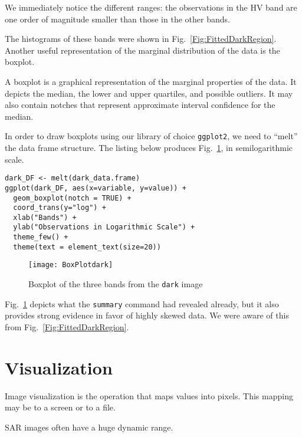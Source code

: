 We immediately notice the different ranges: the observations in the HV band are one order of magnitude smaller than those in the other bands.

The histograms of these bands were shown in Fig.~\ref{Fig:FittedDarkRegion}.
Another useful representation of the marginal distribution of the data is the boxplot.

A boxplot is a graphical representation of the marginal properties of the data.
It depicts the median, the lower and upper quartiles, and possible outliers.
It may also contain notches that represent approximate interval confidence for the median.

In order to draw boxplots using our library of choice \texttt{ggplot2}, we need to ``melt'' the data frame structure.
The listing below produces Fig.~\ref{Fig:BoxplotDark}, in semilogarithmic scale.

\begin{lstlisting}
dark_DF <- melt(dark_data.frame)
ggplot(dark_DF, aes(x=variable, y=value)) + 
  geom_boxplot(notch = TRUE) + 
  coord_trans(y="log") + 
  xlab("Bands") +
  ylab("Observations in Logarithmic Scale") + 
  theme_few() +
  theme(text = element_text(size=20))
\end{lstlisting}

\begin{figure}
\centering
\texttt{[image: BoxPlotdark]}
\caption{Boxplot of the three bands from the \texttt{dark} image}\label{Fig:BoxplotDark}
\end{figure}

Fig.~\ref{Fig:BoxplotDark} depicts what the \texttt{summary} command had revealed already, but it also provides strong evidence in favor of highly skewed data.
We were aware of this from Fig.~\ref{Fig:FittedDarkRegion}.

\section{Visualization}

Image visualization is the operation that maps values into pixels\cite{IPVG:2008}.
This mapping may be to a screen or to a file.

SAR images often have a huge dynamic range.
